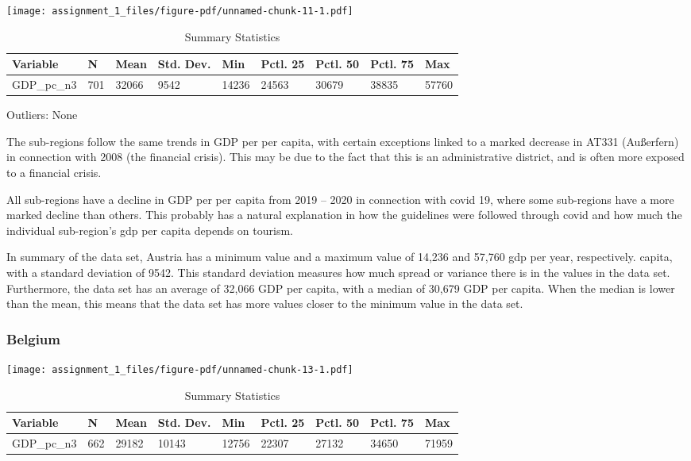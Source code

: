 \documentclass[
  letterpaper,
  DIV=11,
  numbers=noendperiod]{scrartcl}
\begin{document}
\texttt{[image: assignment\_1\_files/figure-pdf/unnamed-chunk-11-1.pdf]}

\begin{table}

\caption{Summary Statistics}
\centering
\begin{tabular}[t]{lllllllll}
\toprule
Variable & N & Mean & Std. Dev. & Min & Pctl. 25 & Pctl. 50 & Pctl. 75 & Max\\
\midrule
GDP_pc_n3 & 701 & 32066 & 9542 & 14236 & 24563 & 30679 & 38835 & 57760\\
\bottomrule
\end{tabular}
\end{table}

Outliers: None

The sub-regions follow the same trends in GDP per per capita, with
certain exceptions linked to a marked decrease in AT331 (Außerfern) in
connection with 2008 (the financial crisis). This may be due to the fact
that this is an administrative district, and is often more exposed to a
financial crisis.

All sub-regions have a decline in GDP per per capita from 2019 -- 2020
in connection with covid 19, where some sub-regions have a more marked
decline than others. This probably has a natural explanation in how the
guidelines were followed through covid and how much the individual
sub-region's gdp per capita depends on tourism.

In summary of the data set, Austria has a minimum value and a maximum
value of 14,236 and 57,760 gdp per year, respectively. capita, with a
standard deviation of 9542. This standard deviation measures how much
spread or variance there is in the values in the data set. Furthermore,
the data set has an average of 32,066 GDP per capita, with a median of
30,679 GDP per capita. When the median is lower than the mean, this
means that the data set has more values closer to the minimum value in
the data set.

\hypertarget{belgium}{%
\subsubsection{Belgium}\label{belgium}}

\texttt{[image: assignment\_1\_files/figure-pdf/unnamed-chunk-13-1.pdf]}

\begin{table}

\caption{Summary Statistics}
\centering
\begin{tabular}[t]{lllllllll}
\toprule
Variable & N & Mean & Std. Dev. & Min & Pctl. 25 & Pctl. 50 & Pctl. 75 & Max\\
\midrule
GDP_pc_n3 & 662 & 29182 & 10143 & 12756 & 22307 & 27132 & 34650 & 71959\\
\bottomrule
\end{tabular}
\end{table}
\end{document}
